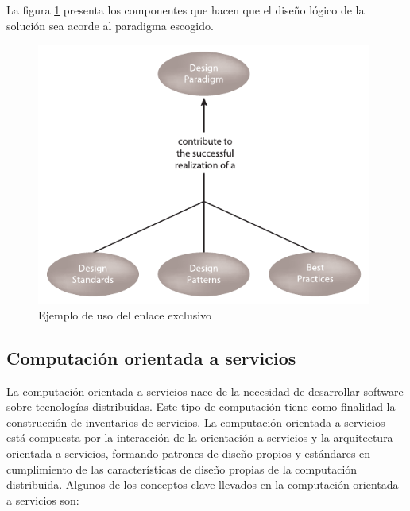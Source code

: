 La figura \ref{fig:tres} presenta los componentes que hacen que el diseño lógico de la solución sea acorde al paradigma escogido.

\begin{figure}[!htb]
  \begin{center}
    \includegraphics[width=11cm]{./imagenes/3.png}
    \caption{Ejemplo de uso del enlace exclusivo}
    \label{fig:tres}
  \end{center}
\end{figure}

\subsection{Computación orientada a servicios}

La computación orientada a servicios nace de la necesidad de desarrollar software sobre tecnologías distribuidas. Este tipo de computación tiene como finalidad la construcción de inventarios de servicios. La computación orientada a servicios está compuesta por la interacción de la orientación a servicios y la arquitectura orientada a servicios, formando patrones de diseño propios y estándares en cumplimiento de las características de diseño propias de la computación distribuida. Algunos de los conceptos clave llevados en la computación orientada a servicios son:

